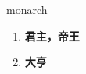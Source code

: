 
\begin{frame}
{\huge monarch}
\begin{center}
\begin{enumerate}\Large
  \item \textbf{君主，帝王}
  \item \textbf{大亨}
\end{enumerate}
\end{center}
\end{frame}

